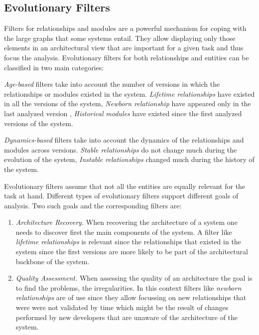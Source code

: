 \documentclass[preprint,12pt]{elsarticle}
\begin{document}
\subsection {Evolutionary Filters}

Filters for relationships and modules are a powerful mechanism for coping with the large graphs that some systems entail. They allow displaying only those elements in an architectural view that are important for a given task and thus focus the analysis. Evolutionary filters for both relationships and entities can be classified in two main categories:

\begin{description}
\item {\em Age-based} filters take into account the number of versions in which the relationships or modules existed in the system. {\em Lifetime relationships} have existed in all the versions of the system, {\em Newborn relationship} have appeared only in the last analyzed version \cite{lungu-relevo}, {\em Historical modules} have existed since the first analyzed versions of the system.
\item {\em Dynamics-based} filters take into account the dynamics of the relationships and modules across versions. {\em Stable relationships} do not change much during the evolution of the system, {\em Instable relationships} changed much during the history of the system.
\end{description}

Evolutionary filters assume that not all the entities are equally relevant for the task at hand. Different types of evolutionary filters support different goals of analysis. Two such goals and the corresponding filters are:

\begin{enumerate}

\item {\em Architecture Recovery.} When recovering the architecture of a system one needs to discover first the main components of the system. A filter like {\em lifetime relationships} is relevant since the relationships that existed in the system since the first versions are more likely to be part of the architectural backbone of the system. %

\item {\em Quality Assessment.} When assessing the quality of an architecture the goal is to find the problems, the irregularities. In this context filters like {\em newborn relationships} are of use since they allow focussing on new relationships that were were not validated by time which might be the result of changes performed by new developers that are unaware of the architecture of the system. %

\end{enumerate}
\end{document}

